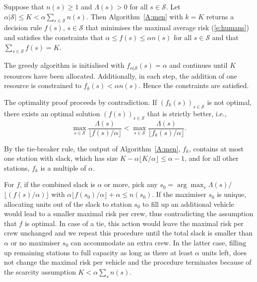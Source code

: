 \documentclass[10pt,a4paper]{amsart}
\renewenvironment{proof}[1]{\par\medskip\noindent\textbf{#1}\enspace\ignorespaces}{\par\medskip}
\begin{document}
\begin{theorem} \label{t:personnel}
Suppose that $n(s) \geq 1$ and $\Lambda(s) > 0$ for all $s\in \mathcal{S}$.
Let $\alpha |\mathcal{S}| \leq K < \alpha \sum_{s\in \mathcal{S}} n(s)$.
Then Algorithm~\ref{A:men} with $k=K$ returns a decision rule $f(s)$,
$s\in \mathcal{S}$ that minimises the maximal average risk (\ref{e:humans}) 
and satisfies the constraints that $\alpha \leq f(s) \leq \alpha n(s)$ 
for all $s\in \mathcal{S}$ and that $\sum_{s\in \mathcal{S}} f(s) = K$.
\end{theorem}

\begin{proof}{}
The greedy algorithm is initialised with 
$f_{\alpha |\mathcal{S}}(s) = \alpha$ and 
continues until $K$ resources have been allocated. 
Additionally, in each step, the addition of one resource
is constrained to $f_k(s) < \alpha  n(s)$.
Hence  the constraints are satisfied. 

The optimality proof proceeds by contradiction.  If $(f_k(s))_{s\in\mathcal{S}}$
is not optimal, there exists an optimal solution $(f(s))_{s\in\mathcal{S}}$ that is strictly better, i.e.,
\[
    \max_{s\in\mathcal{S}} \frac{\Lambda(s)}
    { \lfloor f(s) / \alpha \rfloor }
    < \max_{s\in\mathcal{S}} \frac{\Lambda(s)}
     { \lfloor f_k(s) / \alpha \rfloor }.
\]

By the tie-breaker rule, the 
output of Algorithm~\ref{A:men}, $f_k$, contains at 
most one station with slack, which has size
$K - \alpha\lfloor K/\alpha \rfloor \leq \alpha -1$,
and for all other stations, $f_k$ is a multiple of $\alpha$. 

For $f$, if the combined slack is $\alpha$ or more, pick any 
$s_0 = \arg\max_s \Lambda(s) /$ $ \lfloor 
( f(s) / \alpha ) \rfloor$ with 
$\alpha \lfloor f(s_0) / \alpha \rfloor + \alpha \leq n(s_0)$.
If the maximiser $s_0$ is unique, 
allocating units out of the slack to station $s_0$ to 
fill up an additional vehicle 
would lead to a smaller maximal risk per crew, thus 
contradicting the assumption that $f$ is optimal. In case
of a tie, this action would leave the maximal risk per crew 
unchanged and we repeat this procedure
until the total slack is smaller than 
$\alpha$ or no maximiser $s_0$ can accommodate an extra crew.
In the latter case, filling up  remaining stations to
full capacity  as long as there at least $\alpha$ units
left, does not change the maximal risk per vehicle and
the procedure terminates because of the scarcity assumption
$K < \alpha  \sum_{s} n(s)$. 


\end{proof}
\end{document}
